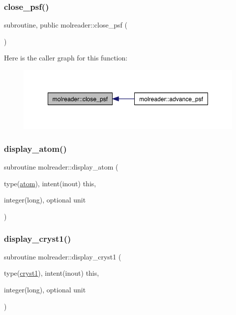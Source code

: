 \subsubsection{\texorpdfstring{close\+\_\+psf()}{close\_psf()}}
{\footnotesize\ttfamily subroutine, public molreader\+::close\+\_\+psf (\begin{DoxyParamCaption}{ }\end{DoxyParamCaption})}

Here is the caller graph for this function\+:\nopagebreak
\begin{figure}[H]
\begin{center}
\leavevmode
\includegraphics[width=350pt]{namespacemolreader_aac446b95d6c274d93e11e45286e60e4d_icgraph}
\end{center}
\end{figure}
\mbox{\label{namespacemolreader_adb757da4ec2256578422254dad5b262e}} 
\subsubsection{\texorpdfstring{display\+\_\+atom()}{display\_atom()}}
{\footnotesize\ttfamily subroutine molreader\+::display\+\_\+atom (\begin{DoxyParamCaption}\item[{type(\hyperlink{structmolreader_1_1atom}{atom}), intent(inout)}]{this,  }\item[{integer(long), optional}]{unit }\end{DoxyParamCaption})\hspace{0.3cm}{\ttfamily [private]}}

\mbox{\label{namespacemolreader_ac9a2b0ff287faa780311cc432b866610}} 
\subsubsection{\texorpdfstring{display\+\_\+cryst1()}{display\_cryst1()}}
{\footnotesize\ttfamily subroutine molreader\+::display\+\_\+cryst1 (\begin{DoxyParamCaption}\item[{type(\hyperlink{structmolreader_1_1cryst1}{cryst1}), intent(inout)}]{this,  }\item[{integer(long), optional}]{unit }\end{DoxyParamCaption})\hspace{0.3cm}{\ttfamily [private]}}

